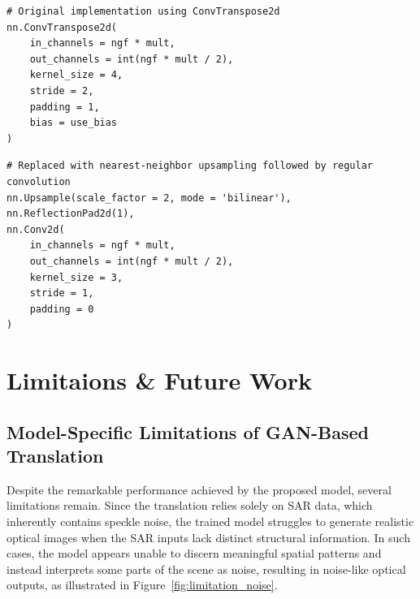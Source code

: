 \begin{lstlisting}[caption={Original transposed convolution block in Pix2Pix}, label={lst:original_convtranspose}]
# Original implementation using ConvTranspose2d
nn.ConvTranspose2d(
    in_channels = ngf * mult,
    out_channels = int(ngf * mult / 2),
    kernel_size = 4,
    stride = 2,
    padding = 1,
    bias = use_bias
)
\end{lstlisting}

\begin{lstlisting}[caption={Modified resize-conv block to mitigate checkerboard artifacts}, label={lst:resize_conv}]
# Replaced with nearest-neighbor upsampling followed by regular convolution
nn.Upsample(scale_factor = 2, mode = 'bilinear'),
nn.ReflectionPad2d(1),
nn.Conv2d(
    in_channels = ngf * mult,
    out_channels = int(ngf * mult / 2),
    kernel_size = 3,
    stride = 1,
    padding = 0
)
\end{lstlisting}


\chapter{Limitaions \& Future Work}
\label{chapter:limitations}
\section{Model-Specific Limitations of GAN-Based Translation}
Despite the remarkable performance achieved by the proposed model, several limitations remain. Since the translation relies solely on SAR data, which inherently contains speckle noise, the trained model struggles to generate realistic optical images when the SAR inputs lack distinct structural information. In such cases, the model appears unable to discern meaningful spatial patterns and instead interprets some parts of the scene as noise, resulting in noise-like optical outputs, as illustrated in Figure~\ref{fig:limitation_noise}.

